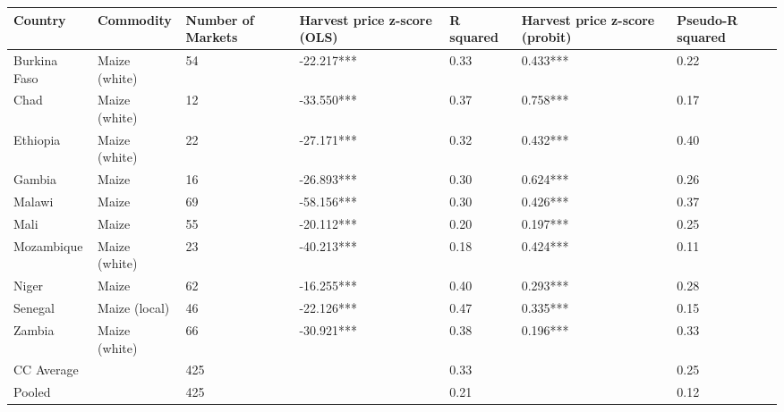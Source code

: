 \begin{table}[ht]
\centering
\begin{tabular}{lllllll}
  \hline
Country & Commodity & Number of Markets & Harvest price z-score (OLS) & R squared & Harvest price z-score (probit) & Pseudo-R squared \\ 
  \hline
Burkina Faso & Maize (white) & 54 & -22.217*** & 0.33 & 0.433*** & 0.22 \\ 
  Chad & Maize (white) & 12 & -33.550*** & 0.37 & 0.758*** & 0.17 \\ 
  Ethiopia & Maize (white) & 22 & -27.171*** & 0.32 & 0.432*** & 0.40 \\ 
  Gambia & Maize & 16 & -26.893*** & 0.30 & 0.624*** & 0.26 \\ 
  Malawi & Maize & 69 & -58.156*** & 0.30 & 0.426*** & 0.37 \\ 
  Mali & Maize & 55 & -20.112*** & 0.20 & 0.197*** & 0.25 \\ 
  Mozambique & Maize (white) & 23 & -40.213*** & 0.18 & 0.424*** & 0.11 \\ 
  Niger & Maize & 62 & -16.255*** & 0.40 & 0.293*** & 0.28 \\ 
  Senegal & Maize (local) & 46 & -22.126*** & 0.47 & 0.335*** & 0.15 \\ 
  Zambia & Maize (white) & 66 & -30.921*** & 0.38 & 0.196*** & 0.33 \\ 
  CC Average &  & 425 &  & 0.33 &  & 0.25 \\ 
  Pooled &  & 425 &  & 0.21 &  & 0.12 \\ 
   \hline
\end{tabular}
\end{table}
